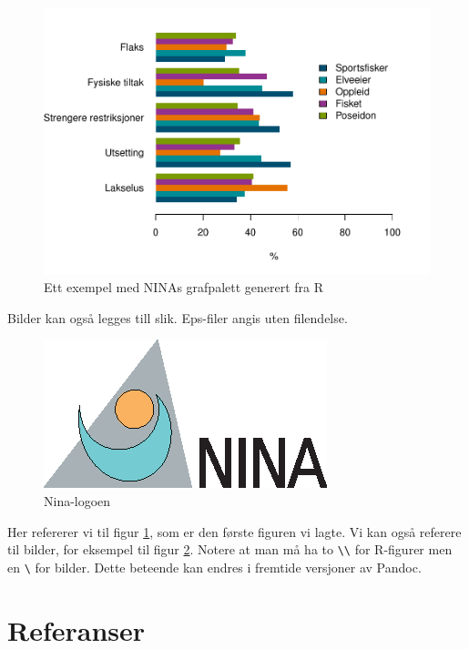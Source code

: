 \documentclass[11pt, a4paper]{article}
\begin{document}
\begin{figure}[htbp]
\centering
\includegraphics{kortrapport_files/figure-latex/test-chunk2-1.pdf}
\caption{Ett exempel med NINAs grafpalett generert fra R
\label{xy_plot}}
\end{figure}

Bilder kan også legges till slik. Eps-filer angis uten filendelse.

\begin{figure}[htbp]
\centering
\includegraphics{logo}
\caption{Nina-logoen \label{logoen}}
\end{figure}

Her refererer vi til figur \ref{xy_plot}, som er den første figuren vi
lagte. Vi kan også referere til bilder, for eksempel til figur
\ref{logoen}. Notere at man må ha to
\texttt{\textbackslash{}\textbackslash{}} for R-figurer men en
\texttt{\textbackslash{}} for bilder. Dette beteende kan endres i
fremtide versjoner av Pandoc.

\clearpage

\section{Referanser}\label{references}
\end{document}
